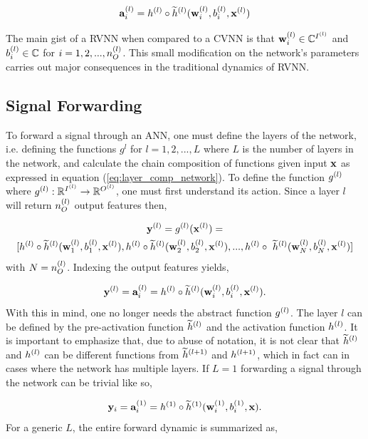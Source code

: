 \begin{equation}
	\mathbf{a}^{(l)}_{i} = h^{(l)} \circ \widetilde{h}^{(l)}(\mathbf{w}^{(l)}_{i}, b^{(l)}_{i}, \mathbf{x}^{(l)})
	\label{eq:comp_act}
\end{equation}

The main gist of a \gls{RVNN} when compared to a \gls{CVNN} is that $ \mathbf{w}^{(l)}_{i} \in \mathbb{C}^{I^{(l)}} $ and $ b^{(l)}_{i} \in \mathbb{C} $ for $ i = 1, 2, ..., n^{(l)}_{O} $. This small modification on the network's parameters carries out major consequences in the traditional dynamics of \gls{RVNN}.

\subsection{Signal Forwarding}
To forward a signal through an \gls{ANN}, one must define the layers of the network, i.e. defining the functions $ g^{l} $ for $ l = 1, 2, ..., L $ where $ L $ is the number of layers in the network, and calculate the chain composition of functions given input $ \mathbf{x} $ as expressed in equation (\ref{eq:layer_comp_network}). To define the function $ g^{(l)} $ where $ g^{(l)}: \mathbb{R}^{I^{(l)}} \rightarrow \mathbb{R}^{O^{(l)}} $, one must first understand its action. Since a layer $ l $ will return $ n^{(l)}_{O} $ output features then,

\begin{multline}
	\y^{(l)} = \actf{l}(\x^{(l)}) = \\ 
	[\af{l} \circ \paf{l}(\w{l}{1}, \bi{l}{1}, \x^{(l)}),
		\af{l} \circ \paf{l}(\w{l}{2}, \bi{l}{2}, \x^{(l)}),
		...,
		\af{l} \circ \ \paf{l} (\w{l}{N}, \bi{l}{N}, \x^{(l)}) ]
\end{multline}
with $ N = n^{(l)}_{O} $. Indexing the output features yields,

\begin{equation}
	\mathbf{y}^{(l)} = \mathbf{a}^{(l)}_{i} = h^{(l)} \circ \widetilde{h}^{(l)}(\mathbf{w}^{(l)}_{i}, b^{(l)}_{i}, \mathbf{x}^{(l)}).
\end{equation}
With this in mind, one no longer needs the abstract function $ g^{(l)} $. The layer $ l $ can be defined by the pre-activation function $ \widetilde{h}^{(l)} $ and the activation function $ h^{(l)} $. It is important to emphasize that, due to abuse of notation, it is not clear that $ \widetilde{h}^{(l)} $ and $ h^{(l)} $ can be different functions from $ \widetilde{h}^{(l+1)} $ and $ h^{(l+1)} $, which in fact can in cases where the network has multiple layers. If $ L = 1 $ forwarding a signal through the network can be trivial like so,

\begin{equation}
	\mathbf{y}_i =  \mathbf{a}^{(1)}_{i} = h^{(1)} \circ \widetilde{h}^{(1)} (\mathbf{w}^{(1)}_{i}, b^{(1)}_{i}, \mathbf{x}).
\end{equation}
For a generic $ L $, the entire forward dynamic is summarized as,

